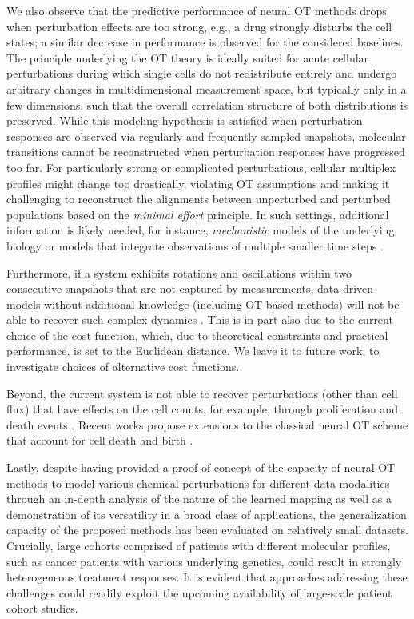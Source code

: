 We also observe that the predictive performance of neural \acrlong{OT} methods drops when perturbation effects are too strong, e.g., a drug strongly disturbs the cell states; a similar decrease in performance is observed for the considered baselines.
The principle underlying the \acrlong{OT} theory is ideally suited for acute cellular perturbations during which single cells do not redistribute entirely and undergo arbitrary changes in multidimensional measurement space, but typically only in a few dimensions, such that the overall correlation structure of both distributions is preserved. While this modeling hypothesis is satisfied when perturbation responses are observed via regularly and frequently sampled snapshots, molecular transitions cannot be reconstructed when perturbation responses have progressed too far. For particularly strong or complicated perturbations, cellular multiplex profiles might change too drastically, violating \acrshort{OT} assumptions and making it challenging to reconstruct the alignments between unperturbed and perturbed populations based on the \emph{minimal effort} principle.
In such settings, additional information is likely needed, for instance, \emph{mechanistic} models of the underlying biology or models that integrate observations of multiple smaller time steps \citep{raue2015data2dynamics, busch2015fundamental}. 

Furthermore, if a system exhibits rotations and oscillations within two consecutive snapshots that are not captured by measurements, data-driven models without additional knowledge (including \acrshort{OT}-based methods) will not be able to recover such complex dynamics \citep{weinreb2018fundamental}. This is in part also due to the current choice of the cost function, which, due to theoretical constraints and practical performance, is set to the Euclidean distance. We leave it to future work, to investigate choices of alternative cost functions. 

Beyond, the current system is not able to recover perturbations (other than cell flux) that have effects on the cell counts, for example, through proliferation and death events \citep{tritschler2019concepts}. Recent works propose extensions to the classical neural \acrlong{OT} scheme that account for cell death and birth \citep{lubeck2022neural, pariset2023unbalanced, chen2022most, baradat2021regularized}.

 Lastly, despite having provided a proof-of-concept of the capacity of neural \acrshort{OT} methods to model various chemical perturbations for different data modalities through an in-depth analysis of the nature of the learned mapping as well as a demonstration of its versatility in a broad class of applications, the generalization capacity of the proposed methods has been evaluated on relatively small datasets.
Crucially, large cohorts comprised of patients with different molecular profiles, such as cancer patients with various underlying genetics, could result in strongly heterogeneous treatment responses.
It is evident that approaches addressing these challenges could readily exploit the upcoming availability of large-scale patient cohort studies.

